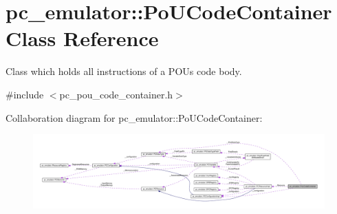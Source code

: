 \hypertarget{classpc__emulator_1_1PoUCodeContainer}{}\section{pc\+\_\+emulator\+:\+:Po\+U\+Code\+Container Class Reference}
\label{classpc__emulator_1_1PoUCodeContainer}


Class which holds all instructions of a P\+OU\textquotesingle{}s code body.  




{\ttfamily \#include $<$pc\+\_\+pou\+\_\+code\+\_\+container.\+h$>$}



Collaboration diagram for pc\+\_\+emulator\+:\+:Po\+U\+Code\+Container\+:\nopagebreak
\begin{figure}[H]
\begin{center}
\leavevmode
\includegraphics[width=350pt]{classpc__emulator_1_1PoUCodeContainer__coll__graph}
\end{center}
\end{figure}
